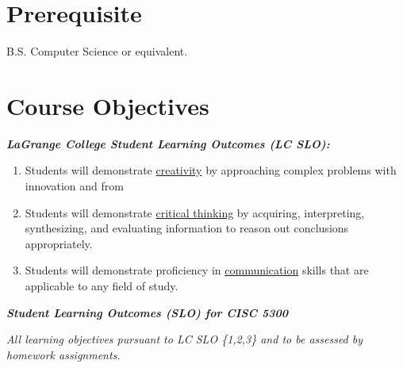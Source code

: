 \documentclass[11pt]{article}
\begin{document}

\section*{Prerequisite}
B.S. Computer Science or equivalent.


\section*{Course Objectives}
\textbf{\textit{LaGrange College Student Learning Outcomes (LC SLO):}}

\begin{enumerate}
\item Students will demonstrate \underline{creativity} by approaching complex problems with innovation and from
\item Students will demonstrate \underline{critical thinking} by acquiring, interpreting, synthesizing, and evaluating
information to reason out conclusions appropriately.
\item Students will demonstrate proficiency in \underline{communication} skills that are applicable to any field of
study.
\end{enumerate}

\textbf{\textit{Student Learning Outcomes (SLO) for CISC 5300}}

\textit{All learning objectives pursuant to LC SLO \{1,2,3\} and to be assessed by homework assignments.}
\end{document}
